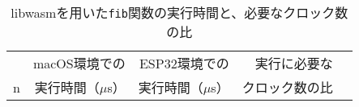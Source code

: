 \begin{table}[htbp]
  \caption{libwasmを用いた{\tt fib}関数の実行時間と、必要なクロック数の比}
  \label{tab:fib_time}
  \begin{center}
    \begin{tabular}{rrrrr}
      \hline
         & macOS環境での & ESP32環境での & 実行に必要な \\
       n & 実行時間（$\mu$s） & 実行時間（$\mu$s） & クロック数の比 \\ \hline \hline

\end{tabular}
\end{center}
\end{table}
